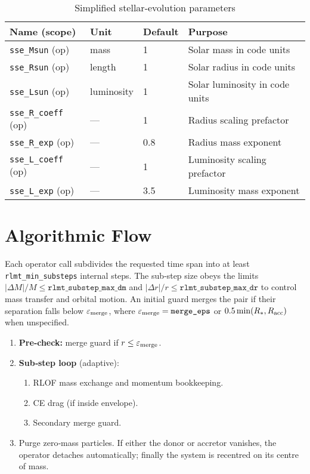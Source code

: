 \documentclass[11pt]{article}
\begin{document}
\begin{table}[h]
\centering\footnotesize
\caption{Simplified stellar-evolution parameters}
\label{tab:sse}
\begin{tabular}{@{}llll@{}}
\toprule
Name (scope) & Unit & Default & Purpose \\
\midrule
\texttt{sse\_Msun}   (op) & mass      & 1   & Solar mass in code units\\
\texttt{sse\_Rsun}   (op) & length     & 1   & Solar radius in code units\\
\texttt{sse\_Lsun}   (op) & luminosity & 1   & Solar luminosity in code units\\
\texttt{sse\_R\_coeff} (op) & —       & 1   & Radius scaling prefactor\\
\texttt{sse\_R\_exp}   (op) & —       & 0.8 & Radius mass exponent\\
\texttt{sse\_L\_coeff} (op) & —       & 1   & Luminosity scaling prefactor\\
\texttt{sse\_L\_exp}   (op) & —       & 3.5 & Luminosity mass exponent\\
\bottomrule
\end{tabular}
\end{table}

\section{Algorithmic Flow}

Each operator call subdivides the requested time span into at least
\texttt{rlmt\_min\_substeps} internal steps.  The sub‑step size obeys the
limits $|\Delta M|/M\le\texttt{rlmt\_substep\_max\_dm}$ and
$|\Delta r|/r\le\texttt{rlmt\_substep\_max\_dr}$ to control mass transfer and
orbital motion.  An initial guard merges the pair if their separation falls
below $\varepsilon_{\rm merge}$, where
$\varepsilon_{\rm merge}=\texttt{merge\_eps}$ or
$0.5\min(R_{*},R_{\rm acc})$ when unspecified.

\begin{enumerate}[nosep]
\item \textbf{Pre‑check:} merge guard if $r\le\varepsilon_{\rm merge}$.
\item \textbf{Sub‑step loop} (adaptive):
  \begin{enumerate}[nosep]
    \item RLOF mass exchange and momentum bookkeeping.
    \item CE drag (if inside envelope).
    \item Secondary merge guard.
  \end{enumerate}
\item Purge zero‑mass particles.  If either the donor or accretor vanishes,
      the operator detaches automatically; finally the system is recentred on
      its centre of mass.
\end{enumerate}
\end{document}

